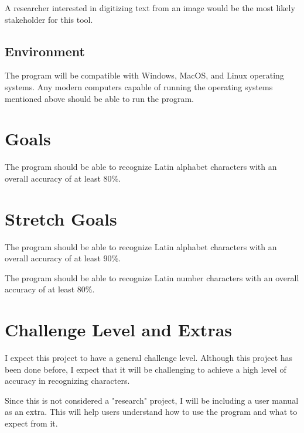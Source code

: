 \documentclass{article}
\begin{document}
A researcher interested in digitizing text from an image would be the most
likely stakeholder for this tool.

\subsection{Environment}

The program will be compatible with Windows, MacOS, and Linux operating systems.
Any modern computers capable of running the operating systems mentioned above
should be able to run the program.

\section{Goals}

The program should be able to recognize Latin alphabet characters with an
overall accuracy of at least 80\%.

\section{Stretch Goals}

The program should be able to recognize Latin alphabet characters with an
overall accuracy of at least 90\%.

The program should be able to recognize Latin number characters with an overall
accuracy of at least 80\%.

\section{Challenge Level and Extras}

I expect this project to have a general challenge level. Although this project
has been done before, I expect that it will be challenging to achieve a high
level of accuracy in recognizing characters.

Since this is not considered a "research" project, I will be including a user
manual as an extra. This will help users understand how to use the program and
what to expect from it.
\end{document}

